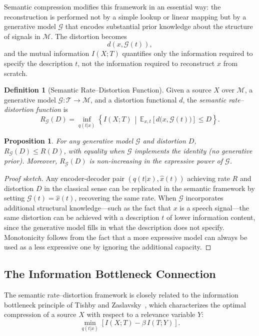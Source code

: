 \documentclass[12pt,a4paper]{article}
\newtheorem{proposition}[theorem]{Proposition}
\theoremstyle{definition}
\newtheorem{definition}[theorem]{Definition}
\theoremstyle{remark}
\begin{document}
Semantic compression modifies this framework in an essential way: the reconstruction is performed not by a simple lookup or linear mapping but by a generative model $\mathcal{G}$ that encodes substantial prior knowledge about the structure of signals in $\mathcal{M}$. The distortion becomes
\[
d(x, \mathcal{G}(t)),
\]
and the mutual information $I(X; T)$ quantifies only the information required to specify the description $t$, not the information required to reconstruct $x$ from scratch.

\begin{definition}[Semantic Rate--Distortion Function]
Given a source $X$ over $\mathcal{M}$, a generative model $\mathcal{G} : \mathcal{T} \rightarrow \mathcal{M}$, and a distortion functional $d$, the \emph{semantic rate--distortion function} is
\[
R_{\mathcal{G}}(D) = \inf_{q(t|x)} \left\{ I(X; T) \,\middle|\, \mathbb{E}_{x, t}\left[d\big(x, \mathcal{G}(t)\big)\right] \le D \right\}.
\]
\end{definition}

\begin{proposition}
For any generative model $\mathcal{G}$ and distortion $D$, $R_{\mathcal{G}}(D) \le R(D)$, with equality when $\mathcal{G}$ implements the identity (no generative prior). Moreover, $R_{\mathcal{G}}(D)$ is non-increasing in the expressive power of $\mathcal{G}$.
\end{proposition}

\begin{proof}[Proof sketch]
Any encoder-decoder pair $(q(t|x), \hat{x}(t))$ achieving rate $R$ and distortion $D$ in the classical sense can be replicated in the semantic framework by setting $\mathcal{G}(t) = \hat{x}(t)$, recovering the same rate. When $\mathcal{G}$ incorporates additional structural knowledge---such as the fact that $x$ is a speech signal---the same distortion can be achieved with a description $t$ of lower information content, since the generative model fills in what the description does not specify. Monotonicity follows from the fact that a more expressive model can always be used as a less expressive one by ignoring the additional capacity.
\end{proof}

\subsection{The Information Bottleneck Connection}

The semantic rate--distortion framework is closely related to the information bottleneck principle of Tishby and Zaslavsky~\cite{tishby}, which characterizes the optimal compression of a source $X$ with respect to a relevance variable $Y$:
\[
\min_{q(t|x)} \left[ I(X; T) - \beta \, I(T; Y) \right].
\]
\end{document}
